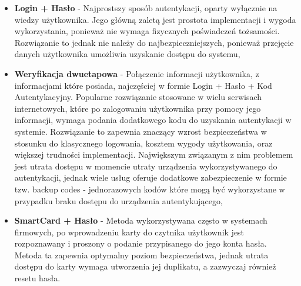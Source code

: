\begin{itemize}
	\item \textbf{Login + Hasło} - Najprostszy sposób autentykacji, oparty wyłącznie na wiedzy użytkownika. Jego główną zaletą jest prostota implementacji i wygoda wykorzystania, ponieważ nie wymaga fizycznych poświadczeń tożsamości. Rozwiązanie to jednak nie należy do najbezpieczniejszych, ponieważ przejęcie danych użytkownika umożliwia uzyskanie dostępu do systemu,
	\item \textbf{Weryfikacja dwuetapowa} - Połączenie informacji użytkownika, z informacjami które posiada, najczęściej w formie Login + Hasło + Kod Autentykacyjny. Popularne rozwiązanie stosowane w wielu serwisach internetowych, które po zalogowaniu użytkownika przy pomocy jego informacji, wymaga podania dodatkowego kodu do uzyskania autentykacji w systemie. Rozwiązanie to zapewnia znaczący wzrost bezpieczeństwa w stosunku do klasycznego logowania, kosztem wygody użytkowania, oraz większej trudności implementacji. Największym związanym z nim problemem jest utrata dostępu w momencie utraty urządzenia wykorzystywanego do autentykacji, jednak wiele usług oferuje dodatkowe zabezpieczenie w formie tzw. backup codes - jednorazowych kodów które mogą być wykorzystane w przypadku braku dostępu do urządzenia autentykującego,
	\item \textbf{SmartCard + Hasło} - Metoda wykorzystywana często w systemach firmowych, po wprowadzeniu karty do czytnika użytkownik jest rozpoznawany i proszony o podanie przypisanego do jego konta hasła. Metoda ta zapewnia optymalny poziom bezpieczeństwa, jednak utrata dostępu do karty wymaga utworzenia jej duplikatu, a zazwyczaj również resetu hasła.
\end{itemize}